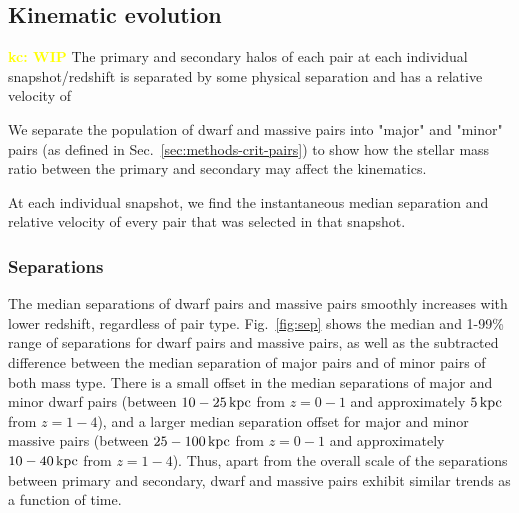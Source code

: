 \documentclass[twocolumn]{aastex631}
\newcommand{\kc}[1]{\textcolor{yellow}{\textbf{kc: #1}} }
\begin{document}
\subsection{Kinematic evolution}\label{sec:results-kinematics}
\kc{WIP}
The primary and secondary halos of each pair at each individual snapshot/redshift is separated by some physical separation and has a relative velocity of 

We separate the population of dwarf and massive pairs into "major" and "minor" pairs (as defined in Sec.~\ref{sec:methods-crit-pairs}) to show how the stellar mass ratio between the primary and secondary may affect the kinematics. 

At each individual snapshot, we find the instantaneous median separation and relative velocity of every pair that was selected in that snapshot. 

\subsubsection{Separations}
The median separations of dwarf pairs and massive pairs smoothly increases with lower redshift, regardless of pair type. 
Fig.~\ref{fig:sep} shows the median and 1-99\% range of separations for dwarf pairs and massive pairs, as well as the subtracted difference between the median separation of major pairs and of minor pairs of both mass type. 
There is a small offset in the median separations of major and minor dwarf pairs (between $10-25\,\mathrm{kpc}$ from  $z=0-1$ and approximately $5\,\mathrm{kpc}$ from $z=1-4$), and a larger median separation offset for major and minor massive pairs (between $25-100\,\mathrm{kpc}$ from  $z=0-1$ and approximately $10-40\,\mathrm{kpc}$ from $z=1-4$). 
Thus, apart from the overall scale of the separations between primary and secondary, dwarf and massive pairs exhibit similar trends as a function of time. 
\end{document}

